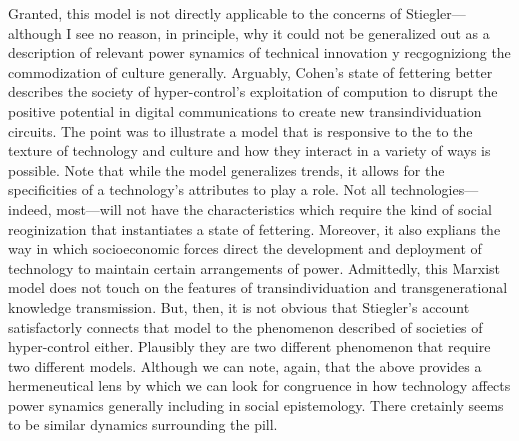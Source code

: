 \documentclass[letterpaper,notitlepage,12pt]{article}
\begin{document}
Granted, this model is not directly applicable to the concerns of
Stiegler---although I see no reason, in principle, why it could not be
generalized out as a description of relevant power synamics of technical
innovation y recgogniziong the commodization of culture generally.
Arguably, Cohen's state of fettering better describes the society of
hyper-control's exploitation of compution to disrupt the positive potential in
digital communications to create new transindividuation circuits.
The point was to illustrate a model that is responsive to the to the texture of
technology and culture and how they interact in a variety of ways is possible.
Note that while the model generalizes trends, it allows for the specificities of
a technology's attributes to play a role.
Not all technologies---indeed, most---will not have the characteristics which
require the kind of social reoginization that instantiates a state of fettering.
Moreover, it also explians the way in which socioeconomic forces direct the
development and deployment of technology to maintain certain arrangements of
power.
Admittedly, this Marxist model does not touch on the features of
transindividuation and transgenerational knowledge transmission.
But, then, it is not obvious that Stiegler's account satisfactorly connects that
model to the phenomenon described of societies of hyper-control either.
Plausibly they are two different phenomenon that require two different models.
Although we can note, again, that the above provides a hermeneutical lens by
which we can look for congruence in how technology affects power synamics
generally including in social epistemology.
There cretainly seems to be similar dynamics surrounding the pill.


\end{document}
